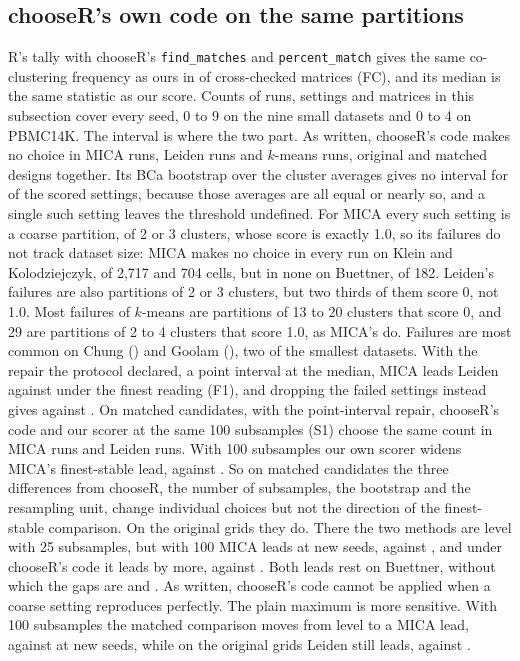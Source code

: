 \subsection{chooseR's own code on the same partitions}\label{sec:chooser}
R's tally with chooseR's \texttt{find\_matches} and \texttt{percent\_match} gives the same co-clustering
frequency as ours in  of  cross-checked matrices (FC), and its median is the
same statistic as our score. Counts of runs, settings and matrices in this subsection cover every seed, 0 to 9 on
the nine small datasets and 0 to 4 on PBMC14K. The interval is where the two part. As written, chooseR's code makes no
choice in  MICA runs,  Leiden runs and 
$k$-means runs, original and matched designs together. Its BCa bootstrap over the cluster averages gives no
interval for  of the  scored settings, because those averages are all equal or nearly so, and a single such setting leaves the threshold undefined. For MICA every such setting is a coarse partition, of 2 or 3 clusters, whose score is exactly 1.0, so its failures do not track dataset size: MICA makes no choice in every run on Klein and Kolodziejczyk, of 2,717 and 704 cells, but in none on Buettner, of 182. Leiden's failures are also partitions of 2 or 3 clusters, but two thirds of them score 0, not 1.0. Most failures of $k$-means are partitions of 13 to 20 clusters that score 0, and 29 are partitions of 2 to 4 clusters that score 1.0, as MICA's do. Failures are most common on Chung
() and Goolam (), two of the smallest datasets. With the repair the
protocol declared, a point interval at the median, MICA leads Leiden  against
 under the finest reading (F1), and dropping the failed settings instead gives
 against . On matched candidates, with the point-interval repair, chooseR's code and our scorer at the same 100 subsamples (S1) choose the same count in  MICA runs and  Leiden runs. With
100 subsamples our own scorer widens MICA's finest-stable lead,  against
. So on matched candidates the three differences from chooseR, the number of subsamples, the bootstrap
and the resampling unit, change individual choices but not the direction of the finest-stable comparison.
On the original grids they do. There the two methods are level with 25 subsamples, but with 100 MICA
leads at  new seeds,  against
, and under chooseR's code it leads by more,  against
. Both leads rest on Buettner, without which the gaps are
 and . As written, chooseR's code cannot be applied
when a coarse setting reproduces perfectly. The plain
maximum is more sensitive. With 100 subsamples the matched comparison moves from level to a MICA lead,
 against  at  new seeds, while on the
original grids Leiden still leads,  against .


